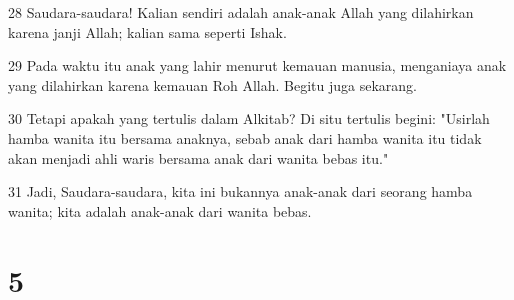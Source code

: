 \par 28 Saudara-saudara! Kalian sendiri adalah anak-anak Allah yang dilahirkan karena janji Allah; kalian sama seperti Ishak.
\par 29 Pada waktu itu anak yang lahir menurut kemauan manusia, menganiaya anak yang dilahirkan karena kemauan Roh Allah. Begitu juga sekarang.
\par 30 Tetapi apakah yang tertulis dalam Alkitab? Di situ tertulis begini: "Usirlah hamba wanita itu bersama anaknya, sebab anak dari hamba wanita itu tidak akan menjadi ahli waris bersama anak dari wanita bebas itu."
\par 31 Jadi, Saudara-saudara, kita ini bukannya anak-anak dari seorang hamba wanita; kita adalah anak-anak dari wanita bebas.

\chapter{5}


